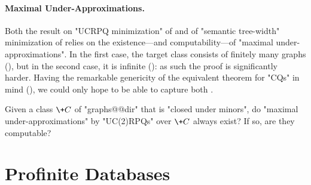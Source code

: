 \paragraph*{Maximal Under-Approximations.}
Both the result on "UCRPQ minimization" of 
and of "semantic tree-width" minimization of  
relies on the existence---and computability---of "maximal under-approximations".
In the first case, the target class consists of finitely many graphs (), but in the second case,
it is infinite (): as such the proof is significantly harder.
Having the remarkable genericity of the equivalent theorem for "CQs" in mind
(), we could only hope to be able to capture 
both .

\begin{question}
	Given a class $\+C$ of "graphs@@dir" that is "closed under minors",
	do "maximal under-approximations" by "UC(2)RPQs" over $\+C$ always exist?
	If so, are they computable?
\end{question}

\section{Profinite Databases}

